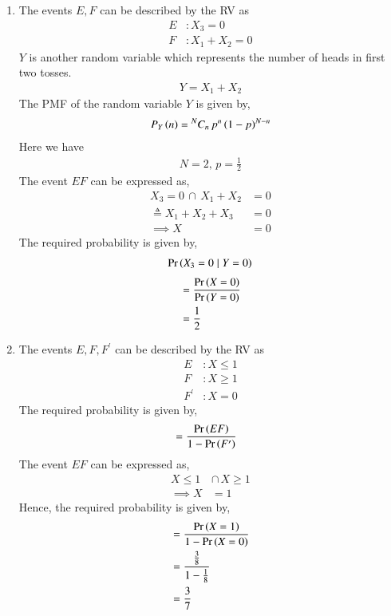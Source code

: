 \documentclass[journal,12pt,twocolumn]{IEEEtran}
\begin{document}
\begin{enumerate}
\begin{enumerate}
\item  The events $E, F$ can be described by the RV as
\begin{align}
E &: X_3 = 0\\
F &: X_1 + X_2 = 0 
\end{align}
$Y$ is another random variable which represents the number of heads in first two tosses.
\begin{align}
Y = X_1 + X_2
\end{align} 
The PMF of the random variable $Y$ is given by,
\begin{align}
P_{Y}\left(n\right) = {^{N}C_{n}} \, {p}^{n} \left(1-p\right)^{N-n}
\end{align}
Here we have
\begin{align}
N = 2, \, p = \frac{1}{2}
\end{align}
The event $EF$ can be expressed as, 
\begin{align}
X_3 = 0 \, \cap \, X_1 + X_2 &= 0  \\
\triangleq  X_1 + X_2 + X_3 &= 0\\
\implies X &= 0
\end{align}
The required probability is given by,
\begin{align}
\Pr\left(X_3 = 0 \mid Y = 0\right)
\end{align}
\begin{align}
&= \frac{\Pr\left(X = 0\right)}{\Pr\left(Y = 0\right)}\\
&= \frac{1}{2}
\end{align}

\item  The events $E, F, F^{\prime}$ can be described by the RV as
\begin{align}
E &: X \leq 1 \label{eq:ncert/12/13/1/6/3}\\
F &: X \geq 1 \label{eq:ncert/12/13/1/6/4}\\
F^{\prime} &: X = 0 
\end{align}
The required probability is given by,
\begin{align}
&= \frac{\Pr\left(EF\right)}{1- \Pr\left(F^{\prime}\right)}
\end{align}
The event $EF$ can be expressed as, 
\begin{align}
X \leq 1 \, &\cap \, X \geq 1\\
\implies X &= 1
\end{align}
Hence, the required probability is given by,
\begin{align}
&= \frac{\Pr\left(X = 1\right)}{1 - \Pr\left(X = 0\right)}  \label{eq:ncert/12/13/1/6/5}\\
&= \frac{\frac{3}{8}}{1-\frac{1}{8}}\\
&= \frac{3}{7}
\end{align}



\end{enumerate}
\end{enumerate}
\end{document}
